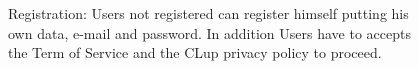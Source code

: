 \begin{figure}[H]
  \caption{Registration: Users not registered can register himself putting his own data, e-mail and password. In addition Users have to accepts the Term of Service and the CLup privacy policy to proceed.}
\end{figure}





